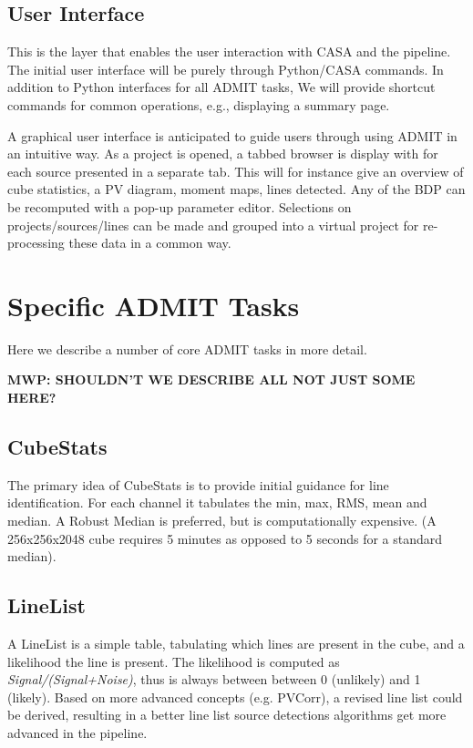 \documentclass{article}
\begin{document}
\subsection{User Interface}

This is the layer that enables the user interaction with CASA and the pipeline. 
The initial user interface will be purely through Python/CASA commands.
In addition to Python interfaces for all ADMIT tasks, We will provide
shortcut commands for common operations, e.g., displaying a summary page.

A graphical user interface is anticipated to guide users through using
ADMIT in an intuitive way. As a project is opened, a tabbed browser is
display with for each source presented in a separate tab. This will for
instance give an overview of cube statistics, a PV diagram, moment maps,
lines detected.  Any of the BDP can be recomputed with a pop-up parameter
editor. Selections on projects/sources/lines can be made and grouped
into a virtual project for re-processing these data in a common way.

\section{Specific ADMIT Tasks}


Here we describe a number of core ADMIT tasks in more detail.

{\bf MWP: SHOULDN'T WE DESCRIBE ALL NOT JUST SOME HERE?}

\subsection{CubeStats}

The primary idea of CubeStats is to provide initial guidance for line
identification. For each channel it tabulates the min, max, RMS, mean
and median.  A Robust Median is preferred, but is computationally 
expensive. (A 256x256x2048 cube requires 5 minutes as opposed to 5 seconds
for a standard median).

\subsection{LineList}

A LineList is a simple table, tabulating which lines are present in the
cube, and a likelihood the line is present. The likelihood is computed as
{\it Signal/(Signal+Noise)}, thus is always between between 0 (unlikely)
and 1 (likely).  Based on more advanced concepts (e.g. PVCorr), a revised
line list could be derived, resulting in a better line list source
detections algorithms get more advanced in the pipeline.
\end{document}
